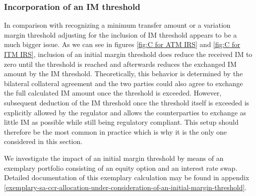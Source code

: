 \documentclass[../Thesis_AHoecherl.tex]{subfiles}
\begin{document}
    \subsubsection{Incorporation of an IM threshold\label{sec:Incorporation of an IM threshold}}
    
    In comparison with recognizing a minimum transfer amount or a variation margin threshold adjusting for the inclusion of \gls{IM} threshold appears to be a much bigger issue.
    As we can see in figures \ref{fig:C for ATM IRS} and \ref{fig:C for ITM IRS}, inclusion of an initial margin threshold does reduce the received \gls{IM} to zero until the threshold is reached and afterwards reduces the exchanged \gls{IM} amount by the \gls{IM} threshold.
    Theoretically, this behavior is determined by the bilateral collateral agreement and the two parties could also agree to exchange the full calculated \gls{IM} amount once the threshold is exceeded.
    However, subsequent deduction of the \gls{IM} threshold once the threshold itself is exceeded is explicitly allowed by the regulator \cite[Background discussion 2(h)]{BCBS_MarginRequirements} and allows the counterparties to exchange as little \gls{IM} as possible while still being regulatory compliant.
    This setup should therefore be the most common in practice which is why it is the only one considered in this section.

    We investigate the impact of an initial margin threshold by means of an exemplary portfolio consisting of an equity option and an interest rate swap.
    Detailed documentation of this exemplary calculation may be found in appendix \ref{exemplary-sa-ccr-allocation-under-consideration-of-an-initial-margin-threshold}.
\end{document}
